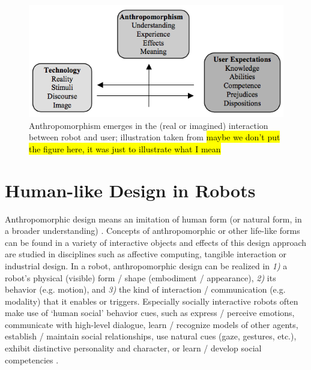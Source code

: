 \documentclass[twocolumn]{svjour3}          %
\begin{document}
\begin{figure}\centering
  \includegraphics[scale=0.42]{persson_anthropomorphism.png}
 \caption{Anthropomorphism emerges in the (real or imagined) interaction between robot and user; illustration taken from \cite{persson_anthropomorphism_2000} \hl{maybe we don't put the figure here, it was just to illustrate what I mean}}
 \label{fig:anthropomorphism_and_interaction}       %
 \end{figure}
	


%
%
%
%
%
%


\section{Human-like Design in Robots}
\label{sec:4}

	Anthropomorphic design means an imitation of human form (or natural form, in a broader understanding) \cite{disalvo_seduction_2003}. Concepts of anthropomorphic or other life-like forms can be found in a variety of interactive objects and effects of this design approach are studied in disciplines such as affective computing, tangible interaction or industrial design. In a robot, anthropomorphic design can be realized in \textit{1)} a robot's physical (visible) form / shape (embodiment / appearance), \textit{2)} its behavior (e.g. motion), and \textit{3)} the kind of interaction / communication (e.g. modality) that it enables or triggers. Especially socially interactive robots often make use of `human social' behavior cues, such as express / perceive emotions, communicate with high-level dialogue, learn / recognize models of other agents, establish / maintain social relationships, use natural cues (gaze, gestures, etc.), exhibit distinctive personality and character, or learn / develop social competencies \cite{fong_survey_2003}.
 
\end{document}

